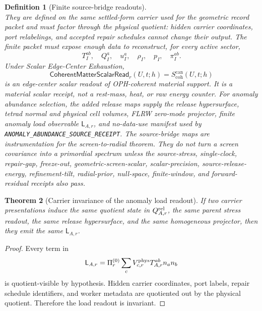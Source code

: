 \documentclass[11pt]{article}
\newtheorem{theorem}{Theorem}[section]
\newtheorem{definition}[theorem]{Definition}
\theoremstyle{remark}
\theoremstyle{plain}
\begin{document}
\begin{definition}[Finite source-bridge readouts]
\[\]
They are defined on the same settled-form carrier used for the geometric record packet and must
factor through the physical quotient: hidden carrier coordinates, port relabelings, and accepted
repair schedules cannot change their output.  The finite packet must expose enough data to
reconstruct, for every active sector,
\[
T_I^{ab},\quad Q_I^a,\quad u_I^a,\quad
\rho_I,\quad p_I,\quad \pi_I^{ab}.
\]
Under Scalar Edge-Center Exhaustion,
\[
\mathsf{CoherentMatterScalarRead}_r(U,t;h)
=S_{\mathrm{coh}}^{\mathrm{can}}(U,t;h)
\]
is an edge-center scalar readout of OPH-coherent material support.  It is a
material scalar receipt, not a rest-mass, heat, or raw energy counter.
For anomaly abundance selection, the added release maps supply the release
hypersurface, tetrad normal and physical cell volumes, FLRW zero-mode
projector, finite anomaly load observable \(\mathsf L_{A,r}\), and
no-data-use manifest used by
\texttt{ANOMALY\_ABUNDANCE\_SOURCE\_RECEIPT}.
The source-bridge maps are instrumentation for the screen-to-radial theorem.  They do not turn a
screen covariance into a primordial spectrum unless the source-stress, single-clock, repair-gap,
freeze-out, geometric-screen-scalar, scalar-precision, source-release-energy, refinement-tilt,
radial-prior, null-space, finite-window, and forward-residual receipts also pass.
\end{definition}

\begin{theorem}[Carrier invariance of the anomaly load readout]
\label{thm:carrier-invariance-anomaly-load}
If two carrier presentations induce the same quotient state in
\(Q^{\rm rel}_{A,r}\), the same parent stress readout, the same release
hypersurface, and the same homogeneous projector, then they emit the same
\(\mathsf L_{A,r}\).
\end{theorem}

\begin{proof}
Every term in
\[
\mathsf L_{A,r}
=
\Pi^{(0)}_r
\sum_cV^{\rm phys}_{c,r}T^{ab}_{A,r}n_an_b
\]
is quotient-visible by hypothesis.  Hidden carrier coordinates, port labels,
repair schedule identifiers, and worker metadata are quotiented out by the
physical quotient.  Therefore the load readout is invariant.
\end{proof}
\end{document}
